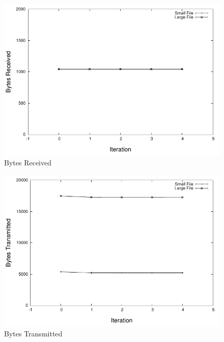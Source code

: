 \documentclass[conference]{IEEEtran}
\begin{document}
\begin{figure}[!t]
\centering
\includegraphics[scale=0.63]{images/rxbytes.pdf}
\caption{Bytes Received}
\label{fig:rxbytes}
\end{figure}

\begin{figure}[!t]
\centering
\includegraphics[scale=0.63]{images/txbytes.pdf}
\caption{Bytes Transmitted}
\label{fig:txbytes}
\end{figure}
\end{document}
